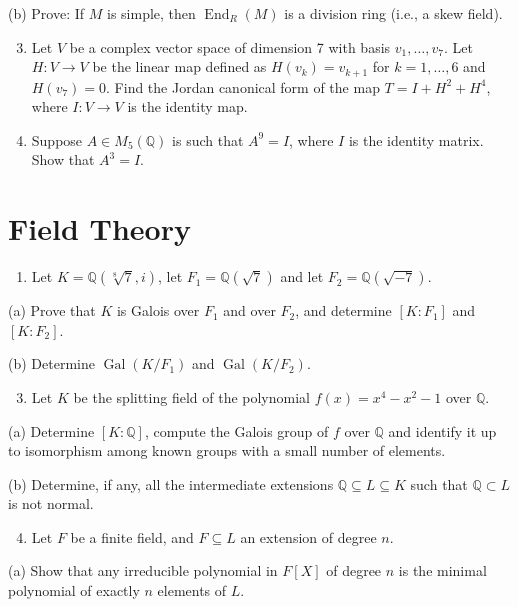\documentclass[10pt]{article}
\begin{document}
(b) Prove: If $M$ is simple, then $\operatorname{End}_{R}(M)$ is a division ring (i.e., a skew field).

\begin{enumerate}
  \setcounter{enumi}{2}
  \item Let $V$ be a complex vector space of dimension 7 with basis $v_{1}, \ldots, v_{7}$. Let $H: V \rightarrow V$ be the linear map defined as $H\left(v_{k}\right)=v_{k+1}$ for $k=1, \ldots, 6$ and $H\left(v_{7}\right)=0$. Find the Jordan canonical form of the map $T=I+H^{2}+H^{4}$, where $I: V \rightarrow V$ is the identity map.

  \item Suppose $A \in M_{5}(\mathbb{Q})$ is such that $A^{9}=I$, where $I$ is the identity matrix. Show that $A^{3}=I$.

\end{enumerate}
\section{Field Theory}
\begin{enumerate}
  \item Let $K=\mathbb{Q}(\sqrt[8]{7}, i)$, let $F_{1}=\mathbb{Q}(\sqrt{7})$ and let $F_{2}=\mathbb{Q}(\sqrt{-7})$.
\end{enumerate}
(a) Prove that $K$ is Galois over $F_{1}$ and over $F_{2}$, and determine $\left[K: F_{1}\right]$ and $\left[K: F_{2}\right]$.

(b) Determine $\operatorname{Gal}\left(K / F_{1}\right)$ and $\operatorname{Gal}\left(K / F_{2}\right)$.

\begin{enumerate}
  \setcounter{enumi}{2}
  \item Let $K$ be the splitting field of the polynomial $f(x)=x^{4}-x^{2}-1$ over $\mathbb{Q}$.
\end{enumerate}
(a) Determine $[K: \mathbb{Q}]$, compute the Galois group of $f$ over $\mathbb{Q}$ and identify it up to isomorphism among known groups with a small number of elements.

(b) Determine, if any, all the intermediate extensions $\mathbb{Q} \subseteq L \subseteq K$ such that $\mathbb{Q} \subset L$ is not normal.

\begin{enumerate}
  \setcounter{enumi}{3}
  \item Let $F$ be a finite field, and $F \subseteq L$ an extension of degree $n$.
\end{enumerate}
(a) Show that any irreducible polynomial in $F[X]$ of degree $n$ is the minimal polynomial of exactly $n$ elements of $L$.
\end{document}
